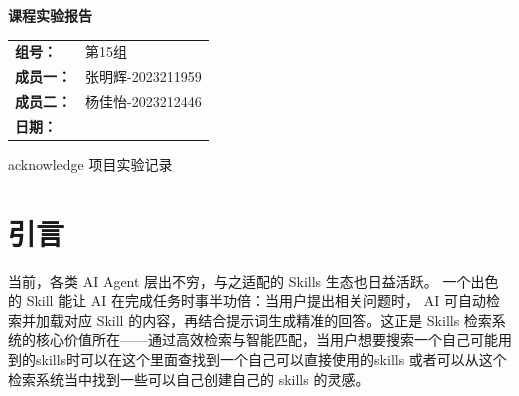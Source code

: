 \makeatletter
\newcommand{\makecoverpage}{
\begin{titlepage}
\centering
\vspace*{2.2cm}
{\zihao{2}\bfseries 课程实验报告\par}
\vspace{1.8cm}
{\zihao{1}\bfseries \@title\par}
\vspace{2.2cm}
\renewcommand{\arraystretch}{1.7}
\begin{tabular}{>{\bfseries}p{3cm}p{8cm}}
组号： & 第15组 \\
成员一： & 张明辉-2023211959 \\
成员二： & 杨佳怡-2023212446 \\
日期： & \@date \\
\end{tabular}
\vfill
{ acknowledge 项目实验记录\par}
\end{titlepage}
}
\makeatother


\makecoverpage

\begin{abstract}
这次实验围绕 skills.sh 上的 1000 条 AI 技能描述做了一个离线检索系统。数据先由 \texttt{paqu.py} 抓下来，再把标题、描述、仓库信息和外置 \texttt{SKILL.md} 统一规整到同一份数据集里。检索部分没有走重模型路线，而是把 TF-IDF 余弦相似度、BM25 和一组后置 boost 规则叠在一起，目标很直接：查询里既有英文短词，也有中文任务描述，结果还得能解释为什么排成这样。

按当前仓库里的真实运行结果，索引覆盖 1000 篇文档、15543 个 term，索引文件大小约 9.10\,MB。对 \texttt{core\_relevance.json} 中 42 条查询做评测时，纯 TF-IDF 的 \texttt{MRR@5} 最好，为 0.9107；混合检索的 \texttt{P@5} 和 \texttt{nDCG@5} 稍高，分别达到 0.2810 和 0.8988。固定权重扫描也说明 BM25 更像补分项，权重压在 0.02 到 0.05 一段时效果最稳。
\end{abstract}

\section{引言}
当前，各类 AI Agent 层出不穷，与之适配的 Skills 生态也日益活跃。
一个出色的 Skill 能让 AI 在完成任务时事半功倍：当用户提出相关问题时，
AI 可自动检索并加载对应 Skill 的内容，再结合提示词生成精准的回答。这正是 Skills 检索系统的核心价值所在——通过高效检索与智能匹配，当用户想要搜索一个自己可能用到的skills时可以在这个里面查找到一个自己可以直接使用的skills
或者可以从这个检索系统当中找到一些可以自己创建自己的 skills 的灵感。

